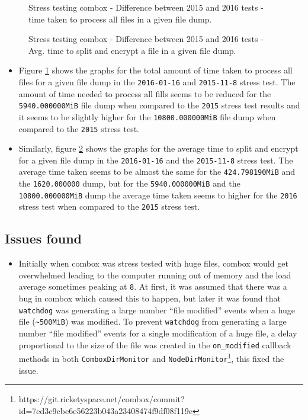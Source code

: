 \begin{figure}[h]
\centering

\caption{Stress testing combox - Difference between 2015 and 2016 tests - time taken to process all files in a given file dump.}
\label{fig:4-st-tt-diff}
\end{figure}

\begin{figure}[h]
\centering

\caption{Stress testing combox - Difference between 2015 and 2016 tests - Avg. time to split and encrypt a file in a given file dump.}
\label{fig:4-st-atsae-diff}
\end{figure}

\begin{itemize}
\item Figure \ref{fig:4-st-tt-diff} shows the graphs for the total
  amount of time taken to process all files for a given file dump in
  the \verb+2016-01-16+ and \verb+2015-11-8+ stress test. The amount
  of time needed to process all fills seems to be reduced for the
  \verb+5940.000000MiB+ file dump when compared to the \verb+2015+
  stress test results and it seems to be slightly higher for the
  \verb+10800.000000MiB+ file dump when compared to the \verb+2015+
  stress test.
\item Similarly, figure \ref{fig:4-st-atsae-diff} shows the graphs for
  the average time to split and encrypt for a given file dump in the
  \verb+2016-01-16+ and the \verb+2015-11-8+ stress test. The average
  time taken seems to be almost the same for the \verb+424.798190MiB+
  and the \verb+1620.000000+ dump, but for the \verb+5940.000000MiB+
  and the \verb+10800.000000MiB+ dump the average time taken seems to
  higher for the \verb+2016+ stress test when compared to the
  \verb+2015+ stress test.
\end{itemize}

\subsection{Issues found}\label{4-st-if}

\begin{itemize}
\item Initially when combox was stress tested with huge files, combox
  would get overwhelmed leading to the computer running out of memory
  and the load average sometimes peaking at \verb+8+. At first, it was
  assumed that there was a bug in combox which caused this to happen,
  but later it was found that \verb+watchdog+\cite{pylib:watchdog} was
  generating a large number ``file modified'' events when a huge file
  (\verb+~500MiB+) was modified. To prevent \verb+watchdog+ from
  generating a large number ``file modified'' events for a single
  modification of a huge file, a delay proportional to the size of the
  file was created in the \verb+on_modified+ callback methods in both
  \verb+ComboxDirMonitor+ and
  \verb+NodeDirMonitor+\footnote{https://git.ricketyspace.net/combox/commit?id=7ed3c9cbe6e56223b043a23408474f9df08f119e},
  this fixed the issue.
\end{itemize}